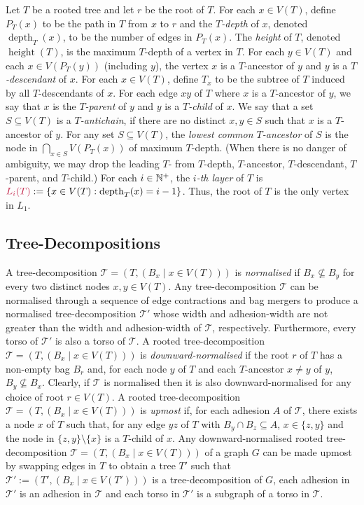 \documentclass{patmorin}
\makeatletter
\newcommand{\pat}[1]{\textcolor{Magenta}{PaMo: #1}}
\newcommand{\gwen}[1]{\textcolor{Purple}{GJ: #1}}
\DeclareMathOperator{\height}{height}
\DeclareMathOperator{\depth}{depth}
\newcommand{\defin}[1]{\emph{\textcolor{brightmaroon}{#1}}}
\def\mathcolor#1#{\@mathcolor{#1}}
\def\@mathcolor#1#2#3{%
  \protect\leavevmode
  \begingroup
    \color#1{#2}#3%
  \endgroup
}
\newcommand{\mathdefin}[1]{\mathcolor{brightmaroon}{#1}}
\newcommand{\calT}{\mathcal{T}}
\makeatother
\begin{document}
  Let $T$ be a rooted tree and let $r$ be the root of $T$. For each $x\in V(T)$, define \defin{$P_T(x)$} to be the path in $T$ from $x$ to $r$ and the \defin{$T$-depth} of $x$, denoted \defin{$\depth_T(x)$}, to be the number of edges in $P_T(x)$.
  The \defin{height} of $T$, denoted \defin{$\height(T)$}, is the maximum $T$-depth of a vertex in $T$.
  For each $y\in V(T)$ and each $x\in V(P_T(y))$ (including $y$),  the vertex $x$ is a $T$-ancestor of $y$ and $y$ is a \defin{$T$-descendant} of $x$.  For each $x\in V(T)$, define \defin{$T_x$} to be the subtree of $T$ induced by all $T$-descendants of $x$.
  For each edge $xy$ of $T$ where $x$ is a $T$-ancestor of $y$, we say that $x$ is the \defin{$T$-parent} of $y$ and $y$ is a \defin{$T$-child} of $x$. 
  We say that a set $S\subseteq V(T)$ is a \defin{$T$-antichain}, if there are no distinct $x,y\in S$ such that $x$ is a $T$-ancestor of $y$. 
  For any set $S\subseteq V(T)$, the \defin{lowest common $T$-ancestor} of $S$ is the node in $\bigcap_{x\in S} V(P_T(x))$ of maximum $T$-depth. (When there is no danger of ambiguity, we may drop the leading $T$- from $T$-depth, $T$-ancestor, $T$-descendant, $T$-parent, and $T$-child.)
  For each $i\in\mathbb{N}^+$, the \defin{$i$-th layer} of $T$ is $\mathdefin{L_i(T)}:=\{x\in V(T):\depth_T(x)=i-1\}$.
  Thus, the root of $T$ is the only vertex in $L_1$.


  \subsection{Tree-Decompositions}

  A tree-decomposition $\calT=(T,(B_x \mid x\in V(T)))$ is \defin{normalised} if $B_x\not\subseteq B_y$ for every two distinct nodes $x,y\in V(T)$.   Any tree-decomposition $\calT$ can be normalised through a sequence of edge contractions and bag mergers to produce a normalised tree-decomposition $\calT'$ whose width and adhesion-width are not greater than the width and adhesion-width of $\calT$, respectively. Furthermore, every torso of $\calT'$ is also a torso of $\calT$.  A rooted tree-decomposition $\calT=(T,(B_x \mid x\in V(T)))$ is \defin{downward-normalised} if the root $r$ of $T$ has a non-empty bag $B_r$ and, for each node $y$ of $T$ and each $T$-ancestor $x\neq y$ of $y$, $B_y\not\subseteq B_x$.  Clearly, if $\calT$ is normalised then it is also downward-normalised for any choice of root $r\in V(T)$.  A rooted tree-decomposition $\calT=(T,(B_x \mid x\in V(T)))$ is \defin{upmost} if, for each adhesion $A$ of $\calT$, there exists a node $x$ of $T$ such that, for any edge $yz$ of $T$ with $B_y\cap B_z\subseteq A$, $x\in\{z,y\}$ and the node in $\{z,y\}\setminus\{x\}$ is a $T$-child of $x$.  Any downward-normalised rooted tree-decomposition $\calT=(T,(B_x \mid x\in V(T)))$ of a graph $G$ can be made upmost by swapping edges in $T$ 
  to obtain a tree $T'$ such that $\calT':=(T', (B_x \mid x\in V(T')))$ is a tree-decomposition of $G$, each adhesion in $\calT'$ is an adhesion in $\calT$ and each torso in $\calT'$ is a subgraph of a torso in $\calT$.
  
\end{document}
